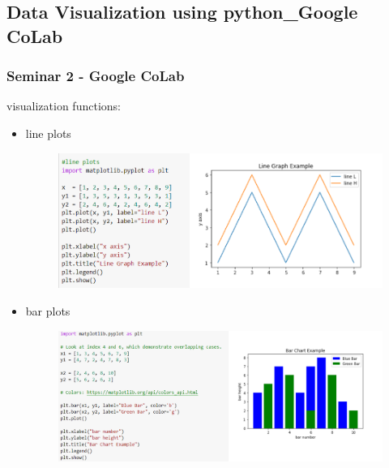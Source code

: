 \documentclass{beamer}
\begin{document}
\subsection{Data Visualization using python\_Google CoLab} 
\begin{frame}
\frametitle{Seminar 2 - Google CoLab}
visualization functions: 
\begin{itemize}
  \item line plots
        \begin{figure} 
        \includegraphics[width=0.7\linewidth]{Seminar_2_images/Google_Colab/lineplots.png}
        \end{figure}
  \item bar plots
        \begin{figure}
        \includegraphics[width=0.7\linewidth]{Seminar_2_images/Google_Colab/barplots.png}
        \end{figure}
\end{itemize}
\end{frame}
\end{document}
